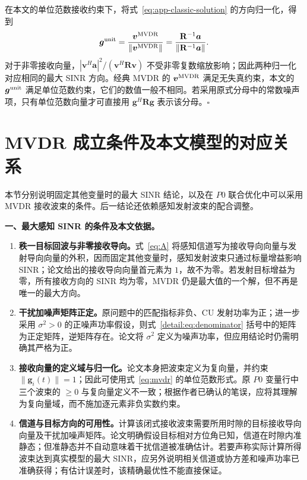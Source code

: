 \documentclass[11pt,a4paper]{ctexart}
\begin{document}
在本文的单位范数接收约束下，将式~\eqref{eq:app-classic-solution} 的方向归一化，得到
\begin{equation}\label{eq:app-unit-norm}
\bm g^{\rm unit}=\frac{\bm v^{\rm MVDR}}{\|\bm v^{\rm MVDR}\|}
=\frac{\mathbf R^{-1}\bm a}{\|\mathbf R^{-1}\bm a\|}.
\end{equation}
对于非零接收向量，$|\bm v^H\bm a|^2/(\bm v^H\mathbf R\bm v)$ 不受非零复数缩放影响；因此两种归一化对应相同的最大 SINR 方向。经典 MVDR 的 $\bm v^{\rm MVDR}$ 满足无失真约束，本文的 $\bm g^{\rm unit}$ 满足单位范数约束，它们的数值一般不相同。若采用原式分母中的常数噪声项，只有单位范数向量才可直接用 $\bm g^H\mathbf R\bm g$ 表示该分母。\hfill$\square$

\clearpage
\section{MVDR 成立条件及本文模型的对应关系}\label{app:conditions}
本节分别说明固定其他变量时的最大 SINR 结论，以及在 $P0$ 联合优化中可以采用 MVDR 接收波束的条件。后一结论还依赖感知发射波束的配合调整。

\noindent\textbf{一、最大感知 SINR 的条件及本文依据。}
\begin{enumerate}[label=\textbf{(\arabic*)},leftmargin=*]
\item \textbf{秩一目标回波与非零接收导向。}式~\eqref{eq:A} 将感知信道写为接收导向向量与发射导向向量的外积，因而固定其他变量时，感知发射波束只通过标量增益影响 SINR；论文给出的接收导向向量首元素为 $1$，故不为零。若发射目标增益为零，所有接收方向的 SINR 均为零，MVDR 仍是最大值的一个解，但不再是唯一的最大方向。
\item \textbf{干扰加噪声矩阵正定。}原问题中的匹配指标非负、CU 发射功率为正；进一步采用 $\sigma^2>0$ 的正噪声功率假设，则式~\eqref{detail:eq:denominator} 括号中的矩阵为正定矩阵，逆矩阵存在。论文将 $\sigma^2$ 定义为噪声功率，但应用结论时仍需明确其严格为正。
\item \textbf{接收向量的定义域与归一化。}论文本身把波束定义为复向量，并约束 $\|\bm g_i(t)\|=1$；因此可使用式~\eqref{eq:mvdr} 的单位范数形式。原 $P0$ 变量行中三个波束的 $\ge0$ 与复向量定义不一致；根据作者已确认的笔误，应将其理解为复向量域，而不施加逐元素非负实数约束。
\item \textbf{信道与目标方向的可用性。}计算该闭式接收波束需要所用时隙的目标接收导向向量及干扰加噪声矩阵。论文明确假设目标相对方位角已知，信道在时隙内准静态；但准静态并不自动意味着干扰信道被准确估计。若要声称实际计算所得波束达到真实模型的最大 SINR，应另外说明相关信道或协方差和噪声功率已准确获得；有估计误差时，该精确最优性不能直接保证。
\end{enumerate}
\end{document}

